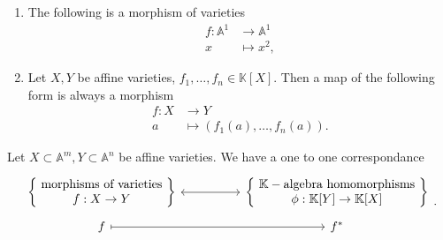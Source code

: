 \begin{ex}\leavevmode\vspace{-.2\baselineskip}
	\begin{enumerate}
		\item The following is a morphism of varieties
			\begin{align}
				 f: \mathbb{A}^1 &\to \mathbb{A}^1 \\
				x &\mapsto x^2
			,\end{align} 
		\item Let $X, Y$ be affine varieties, $f_1, \ldots, f_n \in \mathbb{K}[X]$. Then a map of the following form is always a morphism
			\begin{align}
				f: X &\to Y \\
				a &\mapsto \left( f_1(a), \ldots, f_n(a) \right)
			.\end{align} 
	\end{enumerate}
\end{ex} 

\begin{lem}
	Let $X \subset \mathbb{A}^m, Y \subset \mathbb{A}^n$ be affine varieties.
	We have a one to one correspondance
	\begin{equation}
	\begin{tikzcd}[row sep=tiny]
			\left\{\begin{matrix}
				\text{ morphisms of varieties }\\
				f: X \to Y
			\end{matrix}\right\} \arrow[rr, "", leftrightarrow] & &
			\left\{  \begin{matrix}
				\ \K-\text{algebra homomorphisms }\\
				\phi: \mathbb{K}[Y] \to \mathbb{K}[X]
			\end{matrix}\right\} \\
			f \arrow[rr, "", rightarrow, maps to] & & f^*
	\end{tikzcd}
	.\end{equation} 
\end{lem} 

